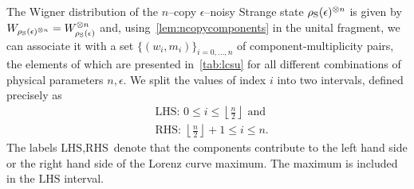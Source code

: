 \documentclass[pra,
aps,
twocolumn,
superscriptaddress,
groupedaddress,
nofootinbib,
reprint
]{revtex4-1}
\begin{document}
The Wigner distribution of the $n$--copy $\epsilon$--noisy Strange state $\rho_{\rm{S}}(\epsilon)^{\otimes n}$ is given by $\W{\rho_{\rm{S}}(\epsilon)^{\otimes n}} = W_{\rho_{\rm{S}}(\epsilon)}^{\otimes n}$ and, using~\cref{lem:ncopycomponents} in the unital fragment, we can associate it with a set $\{(w_i, m_i)\}_{i=0,\dots,n}$ of component-multiplicity pairs, the elements of which are presented in~\cref{tab:lcsu} for all different combinations of physical parameters $n, \epsilon$.
We split the values of index $i$ into two intervals, defined precisely as
\begin{align}
&\text{LHS: } 0 \leq i \leq \left\lfloor \frac{n}{2} \right\rfloor \text{ and} \\
&\text{RHS: } \left\lfloor \frac{n}{2} \right\rfloor +1 \leq i \leq n.
\end{align}
The labels $\text{LHS}, \text{RHS}$ denote that the components contribute to the left hand side or the right hand side of the Lorenz curve maximum.
The maximum is included in the $\text{LHS}$ interval.
\end{document}
